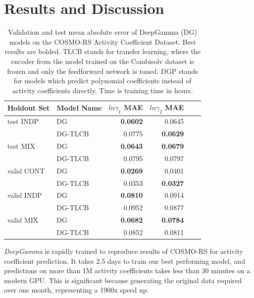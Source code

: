 \section{Results and Discussion}

\begin{table}
    \centering
    \caption{Validation and test mean absolute error of DeepGamma (DG) models on the COSMO-RS Activity  Coefficient Dataset. Best results are bolded. TLCB stands for transfer learning, where the encoder from the model trained on the Combisolv dataset is frozen and only the feedforward network is tuned. DGP stands for models which predict polynomial coefficients instead of activity coefficients directly. Time is training time in hours.}
    \label{cosmo_rs_results}
    \begin{tabular}{llrrrr}
    \toprule
    Holdout Set & Model Name &  $ln\gamma_1$ MAE &   $ln\gamma_2$ MAE \\
    \midrule
    test INDP & DG & \textbf{0.0602} & 0.0645 \\
              & DG-TLCB & 0.0775 & \textbf{0.0629} \\
    test MIX & DG & \textbf{0.0643} & \textbf{0.0679} \\
              & DG-TLCB & 0.0795 & 0.0797 \\
    valid CONT & DG & \textbf{0.0269} & 0.0401 \\
                & DG-TLCB & 0.0353 & \textbf{0.0327} \\
    valid INDP & DG & \textbf{0.0810 }& 0.0914 \\
              & DG-TLCB & 0.0952 & 0.0877 \\
    valid MIX & DG & \textbf{0.0682 }& \textbf{0.0784} \\
              & DG-TLCB & 0.0852 & 0.0811 \\
    \bottomrule
    \end{tabular}
\end{table}




\textit{DeepGamma} is rapidly trained to reproduce results of COSMO-RS for activity coefficient prediction. It takes 2.5 days to train our best performing model, and predictions on more than 1M activity coefficients takes less than 30 minutes on a modern GPU. This is significant because generating the original data required over one month, representing a 1900x speed up.


